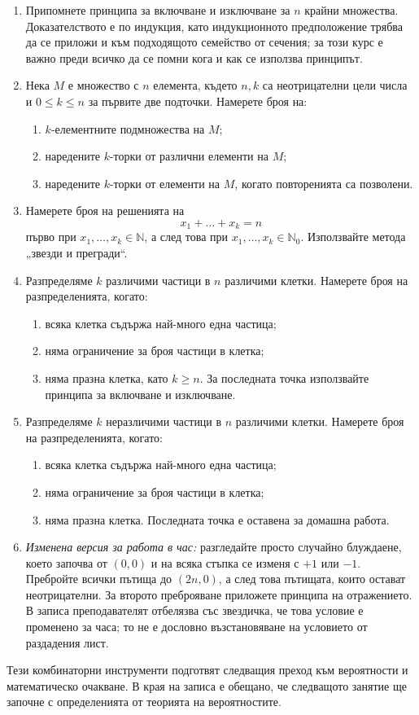 \begin{enumerate}
    \item[1.] Припомнете принципа за включване и изключване за $n$ крайни множества. Доказателството е по индукция, като индукционното предположение трябва да се приложи и към подходящото семейство от сечения; за този курс е важно преди всичко да се помни кога и как се използва принципът.

    \item[2.] Нека $M$ е множество с $n$ елемента, където $n,k$ са неотрицателни цели числа и $0\le k\le n$ за първите две подточки. Намерете броя на:
    \begin{enumerate}
        \item $k$-елементните подмножества на $M$;
        \item наредените $k$-торки от различни елементи на $M$;
        \item наредените $k$-торки от елементи на $M$, когато повторенията са позволени.
    \end{enumerate}

    \item[3.] Намерете броя на решенията на
    \[
    x_1+\dots+x_k=n
    \]
    първо при $x_1,\dots,x_k\in\mathbb{N}$, а след това при $x_1,\dots,x_k\in\mathbb{N}_0$. Използвайте метода „звезди и прегради“.

    \item[4.] Разпределяме $k$ различими частици в $n$ различими клетки. Намерете броя на разпределенията, когато:
    \begin{enumerate}
        \item всяка клетка съдържа най-много една частица;
        \item няма ограничение за броя частици в клетка;
        \item няма празна клетка, като $k\ge n$. За последната точка използвайте принципа за включване и изключване.
    \end{enumerate}

    \item[5.] Разпределяме $k$ неразличими частици в $n$ различими клетки. Намерете броя на разпределенията, когато:
    \begin{enumerate}
        \item всяка клетка съдържа най-много една частица;
        \item няма ограничение за броя частици в клетка;
        \item няма празна клетка. Последната точка е оставена за домашна работа.
    \end{enumerate}

    \item[10.] \emph{Изменена версия за работа в час:} разгледайте просто случайно блуждаене, което започва от $(0,0)$ и на всяка стъпка се изменя с $+1$ или $-1$. Пребройте всички пътища до $(2n,0)$, а след това пътищата, които остават неотрицателни. За второто преброяване приложете принципа на отражението. В записа преподавателят отбелязва със звездичка, че това условие е променено за часа; то не е дословно възстановяване на условието от раздадения лист.
\end{enumerate}

Тези комбинаторни инструменти подготвят следващия преход към вероятности и математическо очакване. В края на записа е обещано, че следващото занятие ще започне с определенията от теорията на вероятностите.
